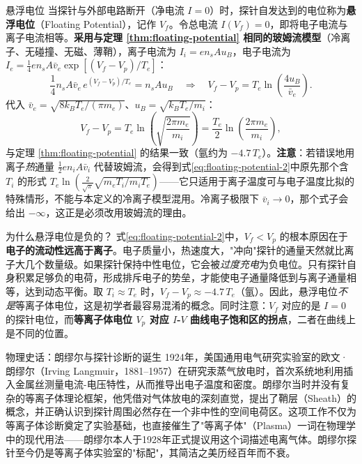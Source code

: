 \documentclass[12pt,a4paper,openany,oneside]{book}
\begin{document}
\begin{definition}{悬浮电位}{}{}
当探针与外部电路断开（净电流 $I = 0$）时，探针自发达到的电位称为\textbf{悬浮电位}（Floating Potential），记作 $V_f$。令总电流 $I(V_f)=0$，即将电子电流与离子电流相等。\textbf{采用与定理 \ref{thm:floating-potential} 相同的玻姆流模型}（冷离子、无碰撞、无磁、薄鞘），离子电流为 $I_i = e n_s A u_B$，电子电流为 $I_e = \frac14 en_sA\bar v_e\exp[(V_f-V_p)/T_e]$：
\begin{equation}
\frac{1}{4}n_sA\bar v_e\,e^{(V_f-V_p)/T_e} = n_s A u_B
\quad\Longrightarrow\quad
V_f - V_p = T_e \ln\!\left(\frac{4u_B}{\bar v_e}\right).
\label{eq:floating-potential-2}
\end{equation}
代入 $\bar v_e = \sqrt{8k_BT_e/(\pi m_e)}$、$u_B=\sqrt{k_BT_e/m_i}$：
\begin{equation}
V_f - V_p = T_e \ln\!\left(\sqrt{\frac{2\pi m_e}{m_i}}\right)
= \frac{T_e}{2}\ln\!\left(\frac{2\pi m_e}{m_i}\right),
\end{equation}
与定理 \ref{thm:floating-potential} 的结果一致（氩约为 $-4.7\,T_e$）。\textbf{注意}：若错误地用离子\emph{热}通量 $\frac12 en_iA\bar v_i$ 代替玻姆流，会得到式\eqref{eq:floating-potential-2}中原先那个含 $T_i$ 的形式 $T_e\ln\!\left(\frac{2}{\sqrt\pi}\sqrt{m_eT_i/m_iT_e}\right)$——它只适用于离子温度可与电子温度比拟的特殊情形，不能与本定义的冷离子模型混用。冷离子极限下 $\bar v_i\to0$，那个式子会给出 $-\infty$，这正是必须改用玻姆流的理由。
\end{definition}

\begin{insight}{为什么悬浮电位是负的？}{}
式\eqref{eq:floating-potential-2}中，$V_f < V_p$ 的根本原因在于\textbf{电子的流动性远高于离子}。电子质量小，热速度大，"冲向"探针的通量天然就比离子大几个数量级。如果探针保持中性电位，它会被\emph{过度充电}为负电位。只有探针自身积累足够负的电荷，形成排斥电子的势垒，才能使电子通量降低到与离子通量相等，达到动态平衡。取 $T_i \approx T_e$ 时，$V_f - V_p \approx -4.7\,T_e$（氩）。因此，悬浮电位\emph{不是}等离子体电位，这是初学者最容易混淆的概念。同时注意：$V_f$ 对应的是 $I=0$ 的探针电位，而\textbf{等离子体电位 $V_p$ 对应 $I$-$V$ 曲线电子饱和区的拐点}，二者在曲线上是不同的位置。
\end{insight}

\begin{history}{物理史话：朗缪尔与探针诊断的诞生}{}{}
1924年，美国通用电气研究实验室的欧文·朗缪尔（Irving Langmuir，1881--1957）在研究汞蒸气放电时，首次系统地利用插入金属丝测量电流-电压特性，从而推导出电子温度和密度。朗缪尔当时并没有复杂的等离子体理论框架，他凭借对气体放电的深刻直觉，提出了鞘层（Sheath）的概念，并正确认识到探针周围必然存在一个非中性的空间电荷区。这项工作不仅为等离子体诊断奠定了实验基础，也直接催生了"等离子体"（Plasma）一词在物理学中的现代用法——朗缪尔本人于1928年正式提议用这个词描述电离气体。朗缪尔探针至今仍是等离子体实验室的"标配"，其简洁之美历经百年而不衰。
\end{history}
\end{document}
